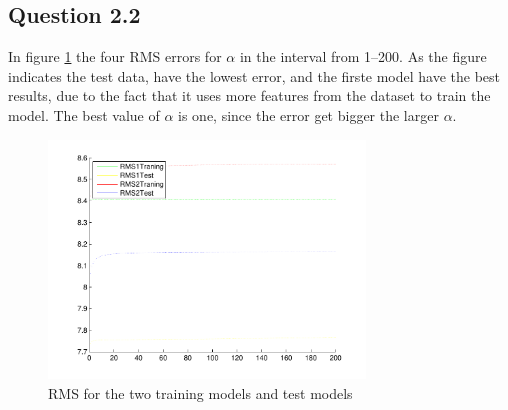 \subsection*{Question 2.2}
In figure \ref{fig:q22} the four RMS errors for $\alpha$ in the
interval from 1--200. As the figure indicates the test data, have the
lowest error, and the firste model have the best results, due to the
fact that it uses more features from the dataset to train the
model. The best value of $\alpha$ is one, since the error get bigger
the larger $\alpha$.

\begin{figure}[!htbp]
  \centering
  \includegraphics[width=0.75\textwidth]{./images/Q2.pdf}
  \caption{RMS for the two training models and test models}
  \label{fig:q22}
\end{figure}


